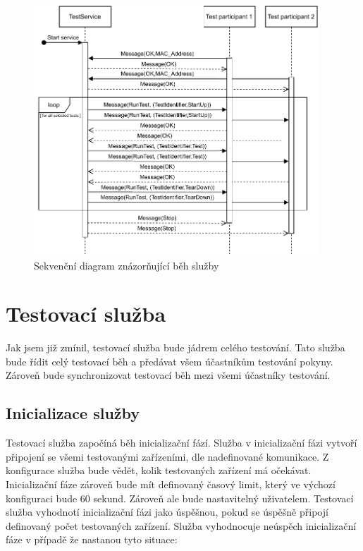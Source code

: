 \begin{figure}[htbp]
    \centering 
    \includegraphics[width=0.95\textwidth]{assets/img/sequencediagram.pdf}
    \caption{Sekvenční diagram znázorňující běh služby}
    \label{fig:seqdiag}
\end{figure}

\section{Testovací služba}
Jak jsem již zmínil, testovací služba bude jádrem celého testování. Tato služba bude řídit celý testovací běh a předávat všem účastníkům testování pokyny. Zároveň bude synchronizovat testovací běh mezi všemi účastníky testování. 

\subsection{Inicializace služby}
Testovací služba započíná běh inicializační fází. Služba v inicializační fázi vytvoří připojení se všemi testovanými zařízeními, dle nadefinované komunikace. Z konfigurace služba bude vědět, kolik testovaných zařízení má očekávat. Inicializační fáze zároveň bude mít definovaný časový limit, který ve výchozí konfiguraci bude 60 sekund. Zároveň ale bude nastavitelný uživatelem. Testovací služba vyhodnotí inicializační fázi jako úspěšnou, pokud se úspěšně připojí definovaný počet testovaných zařízení. Služba vyhodnocuje neúspěch inicializační fáze v případě že nastanou tyto situace:

